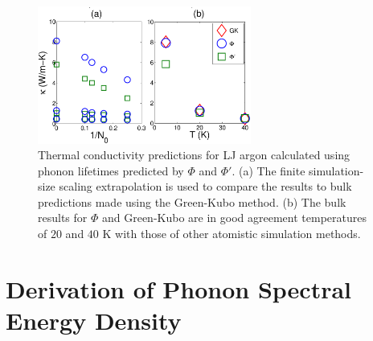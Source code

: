 \documentclass[letterpaper,12pt]{article}
\begin{document}
\begin{figure}
\begin{center}
\includegraphics[angle=0,width=70.0mm]{LJ_NMD_SED_COND_2.eps}
\end{center}
\caption{\label{FIG:LJ_COND} Thermal conductivity predictions for LJ argon calculated using phonon lifetimes predicted by $\Phi$ and $\Phi'$.\cite{Larkin2012} (a) The finite simulation-size scaling extrapolation \cite{turney2009a,He2011a} is used to compare the results to bulk predictions made using the Green-Kubo method. (b) The bulk results for $\Phi$ and Green-Kubo are in good agreement temperatures of $20$ and $40$ K with those of other atomistic simulation methods.\cite{turney2009a}}
\end{figure}


\section{\label{A-Derivation-SED}Derivation of Phonon Spectral Energy Density}
\end{document}

